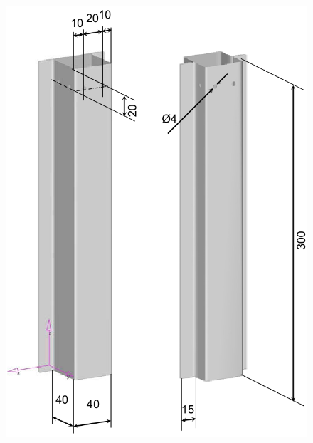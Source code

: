 \documentclass[cmfonts]{witpress}
\begin{document}
\begin{figure}[ht]
  \centering
  \begin{minipage}[b]{.48\linewidth}
    \centering
    \includegraphics[width=\linewidth]{figures/IMG_CUTRES/medidas_cb}
    \label{fig:crash_box}
  \end{minipage}
  \hfill
  \begin{minipage}[b]{.48\linewidth}
    \centering

\end{minipage}
\end{figure}
\end{document}
